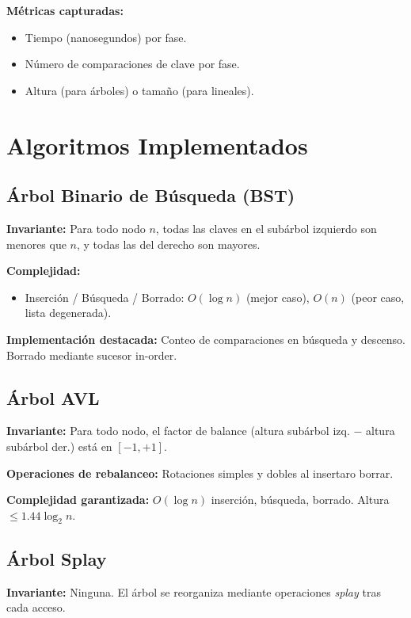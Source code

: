 \documentclass[12pt,a4paper]{article}
\begin{document}
\textbf{Métricas capturadas:}
\begin{itemize}
    \item Tiempo (nanosegundos) por fase.
    \item Número de comparaciones de clave por fase.
    \item Altura (para árboles) o tamaño (para lineales).
\end{itemize}

\section{Algoritmos Implementados}

\subsection{Árbol Binario de Búsqueda (BST)}

\textbf{Invariante:} Para todo nodo $n$, todas las claves en el subárbol izquierdo son menores que $n$, y todas las del derecho son mayores.

\textbf{Complejidad:}
\begin{itemize}
    \item Inserción / Búsqueda / Borrado: $O(\log n)$ (mejor caso), $O(n)$ (peor caso, lista degenerada).
\end{itemize}

\textbf{Implementación destacada:} Conteo de comparaciones en búsqueda y descenso. Borrado mediante sucesor in-order.

\subsection{Árbol AVL}

\textbf{Invariante:} Para todo nodo, el factor de balance (altura subárbol izq. − altura subárbol der.) está en $[-1, +1]$.

\textbf{Operaciones de rebalanceo:} Rotaciones simples y dobles al insertaro borrar.

\textbf{Complejidad garantizada:} $O(\log n)$ inserción, búsqueda, borrado. Altura $\leq 1.44 \log_2 n$.

\subsection{Árbol Splay}

\textbf{Invariante:} Ninguna. El árbol se reorganiza mediante operaciones \emph{splay} tras cada acceso.
\end{document}
